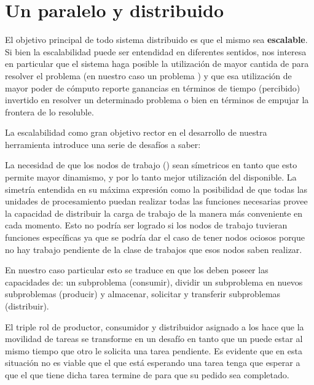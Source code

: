 

\chapter{Un \ssolver paralelo y distribuido }
\label{ssolver-pardist}

El objetivo principal de todo sistema distribuido es que el mismo sea
\textbf{escalable}. Si bien la escalabilidad puede ser entendidad en
diferentes sentidos, nos interesa en particular que el sistema haga posible la
utilización de mayor cantida de \hard para resolver el problema (en nuestro
caso un problema \sat) y que esa utilización de mayor poder de cómputo reporte
ganancias en términos de tiempo (percibido) invertido en resolver un
determinado problema o bien en términos de empujar la frontera de lo
resoluble.

La escalabilidad como gran objetivo rector en el desarrollo de nuestra
herramienta introduce una serie de desafíos a saber:

La necesidad de que los nodos de trabajo (\ws) sean símetricos en
tanto que esto permite mayor dinamismo, y por lo tanto mejor utilización del
\hard disponible. La simetría entendida en su máxima expresión como la
posibilidad de que todas las unidades de procesamiento puedan realizar todas
las funciones necesarias provee la capacidad de distribuir la carga de trabajo
de la manera más conveniente en cada momento. Esto no podría ser logrado si
los nodos de trabajo tuvieran funciones específicas ya que se podría dar el
caso de tener nodos ociosos porque no hay trabajo pendiente de la clase de
trabajos que esos nodos saben realizar.

En nuestro caso particular esto se traduce en que los \ws deben poseer las
capacidades de: \solvear {} un
subproblema (consumir), dividir un subproblema en nuevos subproblemas
(producir) y almacenar, solicitar y transferir subproblemas (distribuir).

El triple rol de productor, consumidor y distribuidor asignado a los \ws hace
que la movilidad de tareas se transforme en un desafío en tanto que un \w
puede estar \solveando al mismo tiempo que otro \w le solicita una tarea
pendiente. Es evidente que en esta situación no es viable que el \w que está
esperando una tarea tenga que esperar a que el \w que tiene dicha tarea
termine de \solvear para que su pedido sea completado.

